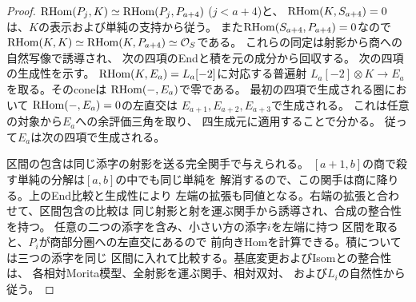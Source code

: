 \begin{proof}
$\operatorname{RHom}(P_j,K)\simeq\operatorname{RHom}(P_j,P_{a+4})$ ($j<a+4$)と、
$\operatorname{RHom}(K,S_{a+4})=0$は、$K$の表示および単純の支持から従う。
また$\operatorname{RHom}(S_{a+4},P_{a+4})=0$なので
$\operatorname{RHom}(K,K)\simeq\operatorname{RHom}(K,P_{a+4})\simeq\mathcal O_S$である。
これらの同定は射影から商への自然写像で誘導され、
次の四項のEndと積を元の成分から回収する。
次の四項の生成性を示す。
$\operatorname{RHom}(K,E_a)=L_a[-2]$に対応する普遍射
$L_a[-2]\otimes K\to E_a$を取る。そのconeは
$\operatorname{RHom}(-,E_a)$で零である。
最初の四項で生成される圏において
$\operatorname{RHom}(-,E_a)=0$の左直交は
$E_{a+1},E_{a+2},E_{a+3}$で生成される。
これは任意の対象から$E_a$への余評価三角を取り、
四生成元に適用することで分かる。
従って$E_a$は次の四項で生成される。

区間の包含は同じ添字の射影を送る完全関手で与えられる。
$[a+1,b]$の商で殺す単純の分解は$[a,b]$の中でも同じ単純を
解消するので、この関手は商に降りる。上のEnd比較と生成性により
左端の拡張も同値となる。右端の拡張と合わせて、区間包含の比較は
同じ射影と射を運ぶ関手から誘導され、合成の整合性を持つ。
任意の二つの添字を含み、小さい方の添字$i$を左端に持つ
区間を取ると、$P_i$が商部分圏への左直交にあるので
前向きHomを計算できる。積については三つの添字を同じ
区間に入れて比較する。基底変更およびIsomとの整合性は、
各相対Morita模型、全射影を運ぶ関手、相対双対、
および$L_i$の自然性から従う。
\end{proof}

